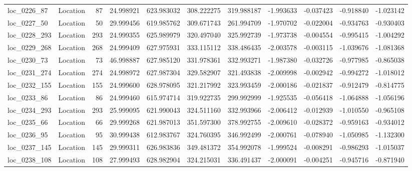 \begin{tabular}{llrrrrrrrrr}
  loc_0226_87 &        Location &              87 &  24.998921 & 623.983032 &  308.222275 &    319.988187 &  -1.993633 &  -0.037423 &   -0.918840 &     -1.023142 \\
  loc_0227_50 &        Location &              50 &  29.999456 & 619.985762 &  309.671743 &    261.994709 &  -1.970702 &  -0.022004 &   -0.934763 &     -0.930403 \\
 loc_0228_293 &        Location &             293 &  24.999355 & 625.989979 &  320.497040 &    325.992739 &  -1.973738 &  -0.004554 &   -0.995415 &     -1.004292 \\
 loc_0229_268 &        Location &             268 &  24.999409 & 627.975931 &  333.115112 &    338.486435 &  -2.003578 &  -0.003115 &   -1.039676 &     -1.081368 \\
  loc_0230_73 &        Location &              73 &  46.998887 & 627.985120 &  331.978361 &    332.993271 &  -1.987380 &  -0.032726 &   -0.977985 &     -0.865038 \\
 loc_0231_274 &        Location &             274 &  24.998972 & 627.987304 &  329.582907 &    321.493838 &  -2.009998 &  -0.002942 &   -0.994272 &     -1.018012 \\
 loc_0232_155 &        Location &             155 &  24.999600 & 628.978095 &  321.217992 &    323.993459 &  -2.000186 &  -0.021837 &   -0.912479 &     -0.814775 \\
  loc_0233_86 &        Location &              86 &  24.999460 & 615.974714 &  319.922735 &    299.992999 &  -1.925535 &  -0.056418 &   -1.064888 &     -1.056196 \\
 loc_0234_293 &        Location &             293 &  25.999095 & 621.990043 &  324.511160 &    332.993966 &  -2.006412 &  -0.012939 &   -1.010550 &     -0.965108 \\
  loc_0235_66 &        Location &              66 &  29.999268 & 621.987013 &  351.597300 &    378.992755 &  -2.009610 &  -0.028372 &   -0.959163 &     -0.934012 \\
  loc_0236_95 &        Location &              95 &  30.999438 & 612.983767 &  324.760395 &    346.992499 &  -2.000761 &  -0.078940 &   -1.050985 &     -1.132300 \\
 loc_0237_145 &        Location &             145 &  29.999311 & 626.983836 &  349.481372 &    354.992078 &  -1.999524 &  -0.008291 &   -0.986293 &     -1.015037 \\
 loc_0238_108 &        Location &             108 &  27.999493 & 628.982904 &  324.215031 &    336.491437 &  -2.000091 &  -0.004251 &   -0.945716 &     -0.871940 \\

\end{tabular}
